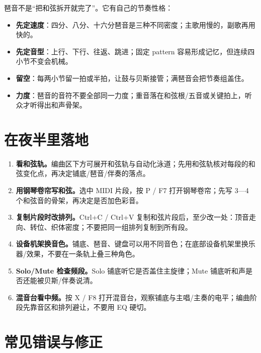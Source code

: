 琶音不是“把和弦拆开就完了”。它有自己的节奏性格：

\begin{itemize}
\item \textbf{先定速度}：四分、八分、十六分琶音是三种不同密度；主歌用慢的，副歌再用快的。
\item \textbf{先定音型}：上行、下行、往返、跳进；固定 pattern 容易形成记忆，但连续四小节不变会机械。
\item \textbf{留空}：每两小节留一拍或半拍，让鼓与贝斯接管；满琶音会把节奏组盖住。
\item \textbf{力度}：琶音的音符不要全部同一力度；重音落在和弦根/五音或关键拍上，听众才听得出和声骨架。
\end{itemize}

\section{在夜半里落地}
\label{sec:harmony-yeban}

\begin{enumerate}
\item \textbf{看和弦轨。}编曲区下方可展开和弦轨与自动化泳道；先用和弦轨核对每段的和弦变化点，再决定铺底/琶音/伴奏的落点。
\item \textbf{用钢琴卷帘写和弦。}选中 MIDI 片段，按 P / F7 打开钢琴卷帘；先写 3—4 个和弦音的骨架，再决定是否加色彩音。
\item \textbf{复制片段时改排列。}Ctrl+C / Ctrl+V 复制和弦片段后，至少改一处：顶音走向、转位、织体密度；不要把同一组排列复制到所有段。
\item \textbf{设备机架换音色。}铺底、琶音、键盘可以用不同音色；在底部设备机架里换乐器/效果，不要在一条轨上叠三种角色。
\item \textbf{Solo/Mute 检查频段。}Solo 铺底听它是否盖住主旋律；Mute 铺底听和声是否还能被贝斯/伴奏说清。
\item \textbf{混音台看中频。}按 X / F8 打开混音台，观察铺底与主唱/主奏的电平；编曲阶段先靠音区和排列避让，不要用 EQ 硬切。
\end{enumerate}


\section{常见错误与修正}
\label{sec:harmony-mistakes}

